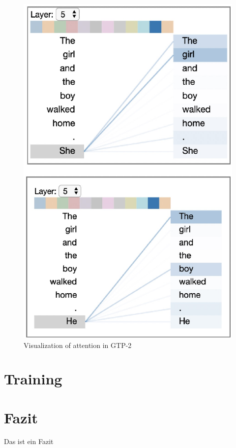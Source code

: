 \documentclass[conference]{IEEEtran}
\begin{document}
\begin{figure}[htbp]
\centerline{\includegraphics{img/attention_visualized.png}}
\caption{Visualization of attention in GTP-2 \cite{visualization_of_attention}}
\label{fig}
\end{figure}


\section{Training}

\section{Fazit}
Das ist ein Fazit



\printbibliography
\end{document}
